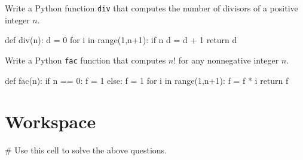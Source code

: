 \documentclass{ximera}
\begin{document}
\begin{question}
	Write a Python function \verb|div| that computes the number of divisors of a positive integer $n$.
\begin{hint}
\begin{sageCell}
def div(n):
        d = 0
        for i in range(1,n+1):
                if n%
                        d = d + 1
        return d
\end{sageCell}
\end{hint}
\end{question}

\begin{question}
	Write a Python \verb|fac| function that computes $n!$ for any nonnegative integer $n$.
\begin{hint}
\begin{sageCell}
def fac(n):
        if n == 0:
                f = 1
        else:
                f = 1
                for i in range(1,n+1):
                        f = f * i
        return f
\end{sageCell}
\end{hint}
\end{question}

\section{Workspace}

\begin{sageCell}
# Use this cell to solve the above questions.
\end{sageCell}
\end{document}
